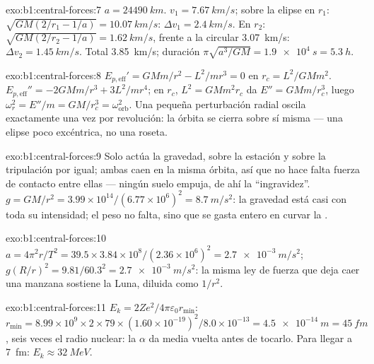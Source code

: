 \begin{solution}{exo:b1:central-forces:7}
$a = \qty{24490}{km}$. $v_1 = \qty{7.67}{km/s}$; sobre la elipse en $r_1$:
$\sqrt{GM(2/r_1 - 1/a)} = \qty{10.07}{km/s}$: $\Delta v_1 = \qty{2.4}{km/s}$.
En $r_2$: $\sqrt{GM(2/r_2 - 1/a)} = \qty{1.62}{km/s}$, frente a la circular
\qty{3.07}{km/s}: $\Delta v_2 = \qty{1.45}{km/s}$. Total \qty{3.85}{km/s};
duración $\pi\sqrt{a^3/GM} = \qty{1.9e4}{s} = \qty{5.3}{h}$.
\end{solution}

\begin{solution}{exo:b1:central-forces:8}
$E_{p,\mathrm{eff}}' = GMm/r^2 - L^2/mr^3 = 0$ en $r_c = L^2/GMm^2$.
$E_{p,\mathrm{eff}}'' = -2GMm/r^3 + 3L^2/mr^4$; en $r_c$, $L^2 = GMm^2r_c$
da $E'' = GMm/r_c^3$, luego $\omega_r^2 = E''/m = GM/r_c^3 = \omega_{\text{orb}}^2$.
Una pequeña perturbación radial oscila exactamente una vez por
revolución: la órbita se cierra sobre sí misma --- una elipse poco
excéntrica, no una roseta.
\end{solution}

\begin{solution}{exo:b1:central-forces:9}
Solo actúa la gravedad, sobre la estación y sobre la tripulación por
igual; ambas caen en la misma órbita, así que no hace falta fuerza de
contacto entre ellas --- ningún suelo empuja, de ahí la ``ingravidez''.
$g = GM/r^2 = 3.99\times10^{14}/(6.77\times10^6)^2
= \qty{8.7}{m/s^2}$: la gravedad está casi con toda su intensidad; el peso
no falta, sino que se gasta entero en curvar la .
\end{solution}

\begin{solution}{exo:b1:central-forces:10}
$a = 4\pi^2r/T^2 = 39.5 \times 3.84\times10^8/(2.36\times10^6)^2 =
\qty{2.7e-3}{m/s^2}$; $g(R/r)^2 = 9.81/60.3^2 = \qty{2.7e-3}{m/s^2}$: la
misma ley de fuerza que deja caer una manzana sostiene la Luna, diluida
como $1/r^2$.
\end{solution}

\begin{solution}{exo:b1:central-forces:11}
$E_k = 2Ze^2/4\pi\varepsilon_0r_{\min}$: $r_{\min} = 8.99\times10^9 \times 2 \times 79
\times (1.60\times10^{-19})^2/8.0\times10^{-13} = \qty{4.5e-14}{m} = \qty{45}{fm}$,
seis veces el radio nuclear: la $\alpha$ da media vuelta antes de tocarlo.
Para llegar a \qty{7}{fm}: $E_k \approx \qty{32}{MeV}$.
\end{solution}


